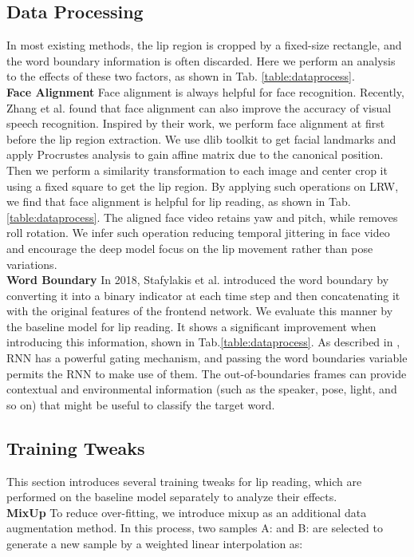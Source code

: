 \documentclass{article}
\begin{document}
\subsection{Data Processing}
In most existing methods, the lip region is cropped by a fixed-size rectangle, and the word boundary information is often discarded. Here we perform an analysis to the effects of these two factors, as shown in Tab. \ref{table:dataprocess}.
\vspace{0.5em}
\\
\indent\textbf{Face Alignment} Face alignment is always helpful for face recognition. Recently, Zhang et al. \cite{zhang2020can} found that face alignment can also improve the accuracy of visual speech recognition. Inspired by their work, we perform face alignment at first before the lip region extraction. We use dlib toolkit \cite{king2009dlib} to get facial landmarks and apply Procrustes analysis to gain affine matrix due to the canonical position. Then we perform a similarity transformation to each image and center crop it using a fixed square to get the lip region. By applying such operations on LRW, we find that face alignment is helpful for lip reading, as shown in Tab.\ref{table:dataprocess}. The aligned face video retains yaw and pitch, while removes roll rotation. We infer such operation reducing temporal jittering in face video and encourage the deep model focus on the lip movement rather than pose variations.
\vspace{0.5em}
\\
\indent\textbf{Word Boundary} In 2018, Stafylakis et al. \cite{stafylakis2018pushing} introduced the word boundary by converting it into a binary indicator at each time step and then concatenating it with the original features of the frontend network. We evaluate this manner by the baseline model for lip reading. It shows a significant improvement when introducing this information, shown in Tab.\ref{table:dataprocess}. As described in \cite{stafylakis2018pushing}, RNN has a powerful gating mechanism, and passing the word boundaries variable permits the RNN to make use of them. The out-of-boundaries frames can provide contextual and environmental information (such as the speaker, pose, light, and so on) that might be useful to classify the target word. 

\vspace{-0.5em}
\subsection{Training Tweaks} 
This section introduces several training tweaks for lip reading, which are performed on the baseline model separately to analyze their effects.\vspace{0.5em}
\\
\indent\textbf{MixUp} To reduce over-fitting, we introduce mixup \cite{zhang2017mixup} as an additional data augmentation method. In this process, two samples A:  and B:  are selected to generate a new sample  by a weighted linear interpolation as: 
\end{document}
